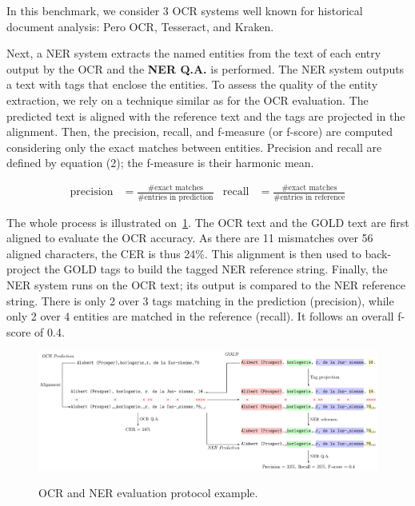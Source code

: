 In this benchmark, we consider 3 OCR systems well known for historical document analysis: Pero OCR, Tesseract, and Kraken. 



Next, a NER system extracts the named entities from the text of each entry output by the OCR and the \textbf{NER Q.A.}
is performed. The NER system outputs a text with tags that enclose the entities. To assess the quality of the entity
extraction, we rely on a technique similar as for the OCR evaluation. The predicted text is aligned with the reference
text and the tags are projected in the alignment. Then, the precision, recall, and f-measure (or f-score) are computed considering
only the exact matches between entities. Precision and recall are defined by equation (2); the f-measure is their harmonic mean.

\begin{align}
    \mathrm{precision} &= \frac{\text{\#exact matches}}{\text{\#entries in prediction}} & \mathrm{recall} &= \frac{\text{\#exact matches}}{\text{\#entries in reference}}
\end{align}


The whole process is illustrated on~\cref{fig.eval-ocr-ner}. The OCR text and the GOLD text are first aligned to
evaluate the OCR accuracy. As there are 11 mismatches over 56 aligned characters, the CER is thus 24\%. This alignment
is then used to back-project the GOLD tags to build the tagged NER reference string. Finally, the NER system runs on the
OCR text; its output is compared to the NER reference string. There is only 2 over 3 tags matching in the prediction (precision),
while only 2 over 4 entities are matched in the reference (recall). It follows an overall f-score of 0.4.

\begin{figure}[tb]
    \includegraphics[width=\linewidth]{figs/eval-ocr-ner.pdf}
    \label{fig.eval-ocr-ner}
    \caption{OCR and NER evaluation protocol example.}
\end{figure}


